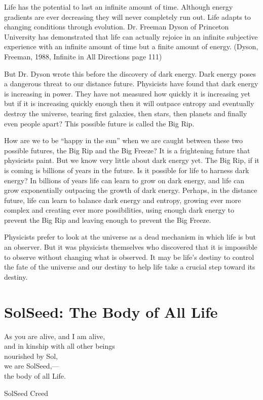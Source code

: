 \documentclass[ebook,12pt,openany,twoside]{memoir}
\newcommand{\tab}{\hspace*{2em}}
\newcommand{\imagefacingchapter}[1]{
  \cleartoverso
  \clearpage \null
  \thispagestyle{cleared}
  \AddToShipoutPictureBG*{%
    \AtStockLowerLeft{%
      \texttt{[image: \#1]}
    }
  }
  \clearpage
}
\begin{document}
Life has the potential to last an infinite amount of time. Although energy
gradients are ever decreasing they will never completely run out. Life adapts
to changing conditions through evolution. Dr. Freeman Dyson of Princeton
University has demonstrated that life can actually rejoice in an infinite
subjective experience with an infinite amount of time but a finite amount of
energy. (Dyson, Freeman, 1988, Infinite in All Directions page 111)

But Dr. Dyson wrote this before the discovery of dark energy. Dark energy poses
a dangerous threat to our distance future. Physicists have found that dark
energy is increasing in power. They have not measured how quickly it is
increasing yet but if it is increasing quickly enough then it will outpace
entropy and eventually destroy the universe, tearing first galaxies, then
stars, then planets and finally even people apart? This possible future is
called the Big Rip.

How are we to be ``happy in the sun'' when we are caught between these two
possible futures, the Big Rip and the Big Freeze? It is a frightening future
that physicists paint. But we know very little about dark energy yet. The Big
Rip, if it is coming is billions of years in the future. Is it possible for
life to harness dark energy? In billions of years life can learn to grow on
dark energy, and life can grow exponentially outpacing the growth of dark
energy. Perhaps, in the distance future, life can learn to balance dark energy
and entropy, growing ever more complex and creating ever more possibilities,
using enough dark energy to prevent the Big Rip and leaving enough to prevent
the Big Freeze.

Physicists prefer to look at the universe as a dead mechanism in which life is
but an observer. But it was physicists themselves who discovered that it is
impossible to observe without changing what is observed. It may be life's
destiny to control the fate of the universe and our destiny to help life take a
crucial step toward its destiny.


\imagefacingchapter{images/BodyOfAllLife-cropped}
\chapter{SolSeed: The Body of All Life}

\setlength\epigraphwidth{2.4in}
\epigraph{
  As you are alive, and I am alive,\\
  and in kinship with all other beings\\
  nourished by Sol,\\
  \tab we are SolSeed,--- \\
  \tab the body of all Life.
}{SolSeed Creed}
\end{document}
